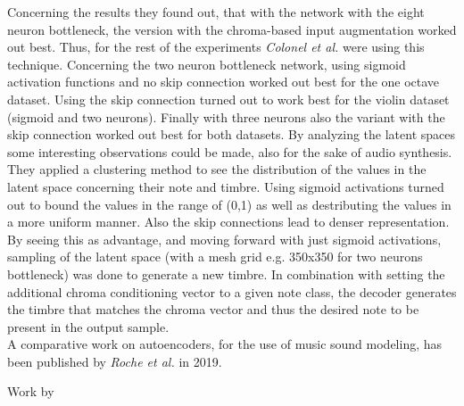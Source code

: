 Concerning the results they found out, that with the network with the eight neuron bottleneck, the version with the chroma-based input augmentation worked out best. Thus, for the rest of the experiments \textit{Colonel et al.} were using this technique. Concerning the two neuron bottleneck network, using sigmoid activation functions and no skip connection worked out best for the one octave dataset. Using the skip connection turned out to work best for the violin dataset (sigmoid and two neurons). Finally with three neurons also the variant with the skip connection worked out best for both datasets. By analyzing the latent spaces some interesting observations could be made, also for the sake of audio synthesis. They applied a clustering method to see the distribution of the values in the latent space concerning their note and timbre. Using sigmoid activations turned out to bound the values in the range of (0,1) as well as destributing the values in a more uniform manner. Also the skip connections lead to denser representation. By seeing this as advantage, and moving forward with just sigmoid activations, sampling of the latent space (with a mesh grid e.g. 350x350 for two neurons bottleneck) was done to generate a new timbre. In combination with setting the additional chroma conditioning vector to a given note class, the decoder generates the timbre that matches the chroma vector and thus the desired note to be present in the output sample.\\

A comparative work on autoencoders, for the use of music sound modeling, has been published by \textit{Roche et al.} in 2019. \cite{roche2019autoencoders}




Work by \cite{hantrakul2019fast}

